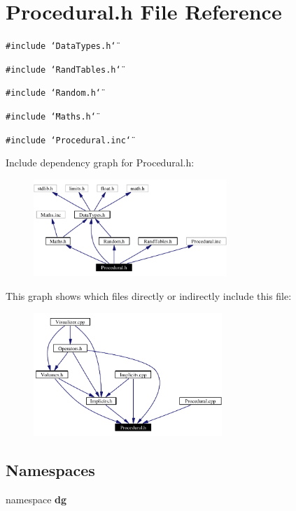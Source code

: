 \section{Procedural.h File Reference}
\label{Procedural_8h}
{\tt \#include \char`\"{}Data\-Types.h\char`\"{}}\par
{\tt \#include \char`\"{}Rand\-Tables.h\char`\"{}}\par
{\tt \#include \char`\"{}Random.h\char`\"{}}\par
{\tt \#include \char`\"{}Maths.h\char`\"{}}\par
{\tt \#include \char`\"{}Procedural.inc\char`\"{}}\par


Include dependency graph for Procedural.h:\begin{figure}[H]
\begin{center}
\leavevmode
\includegraphics[width=207pt]{Procedural_8h__incl}
\end{center}
\end{figure}


This graph shows which files directly or indirectly include this file:\begin{figure}[H]
\begin{center}
\leavevmode
\includegraphics[width=202pt]{Procedural_8h__dep__incl}
\end{center}
\end{figure}
\subsection*{Namespaces}
\begin{CompactItemize}
\item 
namespace {\bf dg}
\end{CompactItemize}
